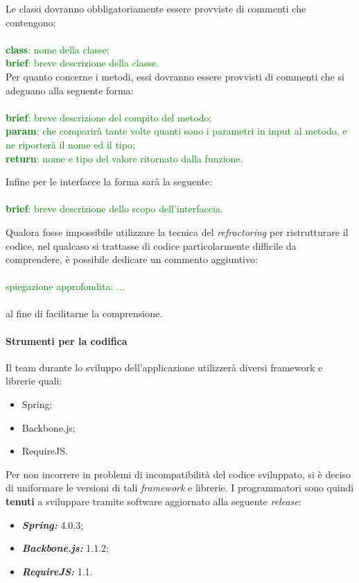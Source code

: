 Le classi dovranno obbligatoriamente essere provviste di commenti che contengono:
\\
\\
\textcolor{green}{
\textbf{class}: nome della classe;\\
\textbf{brief}: breve descrizione della classe.\\
}
Per quanto concerne i metodi, essi dovranno essere provvisti di commenti che si adeguano alla seguente forma:
\\
\\
\textcolor{green}{
\textbf{brief}: breve descrizione del compito del metodo;\\
\textbf{param}: che comparirà tante volte quanti sono i parametri in input al metodo, e ne riporterà il nome ed il tipo;\\
\textbf{return}: nome e tipo del valore ritornato dalla funzione.\\}

Infine per le interfacce la forma sarà la seguente:
\\
\\
\textcolor{green}{
\textbf{brief}: breve descrizione dello scopo dell'interfaccia.\\}

Qualora fosse impossibile utilizzare la tecnica del \textit{refractoring} per ristrutturare il codice, nel qualcaso si trattasse di codice particolarmente difficile da comprendere, è possibile dedicare un commento aggiuntivo:
\\
\\
\textcolor{green}{spiegazione approfondita: ...\\}\\
al fine di facilitarne la comprensione.
\paragraph{Strumenti per la codifica}
Il team \gruppo{} durante lo sviluppo dell'applicazione utilizzerà diversi framework e librerie quali:

\begin{itemize}
\item Spring;
\item Backbone.js;
\item RequireJS.
\end{itemize}

Per non incorrere in problemi di incompatibilità del codice sviluppato, si è deciso di uniformare le versioni di tali \textit{framework} e librerie.
I programmatori sono quindi \textbf{tenuti} a sviluppare tramite software aggiornato alla seguente \textit{release}:
\begin{itemize}
\item \textbf{\textit{Spring:}} 4.0.3;
\item \textbf{\textit{Backbone.js:}} 1.1.2;
\item \textbf{\textit{RequireJS:}} 1.1.
\end{itemize}





